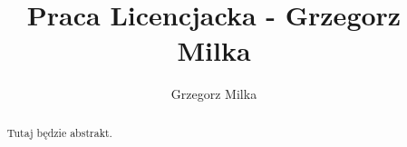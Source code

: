 \documentclass{pracamgr}
\title{Praca Licencjacka - Grzegorz Milka}
\author{Grzegorz Milka}
\begin{document}
\maketitle

\begin{abstract}
Tutaj będzie abstrakt.
\end{abstract}

\tableofcontents




\end{document}
